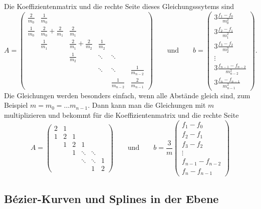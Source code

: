 Die Koeffizientenmatrix und die rechte Seite dieses Gleichungsssytems sind
\[
A
=
\begin{pmatrix}
\displaystyle\frac{2}{m_0}
	&\displaystyle\frac{1}{m_0}
		&
			&
				&
					&
\\[8pt]
\displaystyle\frac{1}{m_0}
	&\displaystyle\frac{2}{m_0}+\frac{2}{m_1}
		&\displaystyle\frac{2}{m_1}
			&
				&
					&
\\[8pt]
	&\displaystyle\frac{1}{m_1}
		&\displaystyle\frac{2}{m_1}+\frac{2}{m_2}
			&\displaystyle\frac{1}{m_2}
				&
					&
\\[8pt]
	&
		&\displaystyle\frac{1}{m_2}
			&\ddots
				&\ddots
					&
\\[8pt]
	&
		&
			&\ddots
				&\ddots
					&\displaystyle\frac{1}{m_{n-2}}
\\[8pt]
	&
		&
			&
				&\displaystyle\frac{1}{m_{n-2}}
					&\displaystyle\frac{2}{m_{n-1}}
\end{pmatrix}
\qquad\text{und}\qquad
b
=
\begin{pmatrix}
\displaystyle3\frac{f_1-f_0}{m_0^2} \\[8pt]
\displaystyle3\frac{f_2-f_1}{m_1^2} \\[8pt]
\displaystyle3\frac{f_3-f_2}{m_2^2} \\[8pt]
\vdots \\[8pt]
\displaystyle3\frac{f_{n-1}-f_{n-2}}{m_{n-2}^2} \\[8pt]
\displaystyle3\frac{f_n-f_{n-1}}{m_{n-1}^2} 
\end{pmatrix}.
\]
Die Gleichungen werden besonders einfach, wenn alle Abstände gleich sind,
zum Beispiel $m=m_0=\dots m_{n-1}$.
Dann kann man die Gleichungen mit $m$ multiplizieren und bekommt für die
Koeffizientenmatrix und die rechte Seite
\[
A
=
\begin{pmatrix}
2&1& &      &      & \\
1&2&1&      &      & \\
 &1&2&1     &      & \\
 & &1&\ddots&\ddots& \\
 & & &\ddots&\ddots&1\\
 & & &      &     1&2
\end{pmatrix}
\qquad\text{und}\qquad
b
=
\frac{3}{m}
\begin{pmatrix}
f_1-f_0\\
f_2-f_1\\
f_3-f_2\\
\vdots\\
f_{n-1}-f_{n-2}\\
f_n-f_{n-1}

\end{pmatrix}
\]

\subsection{Bézier-Kurven und Splines in der Ebene
\label{buch:subsection:bezier}}

